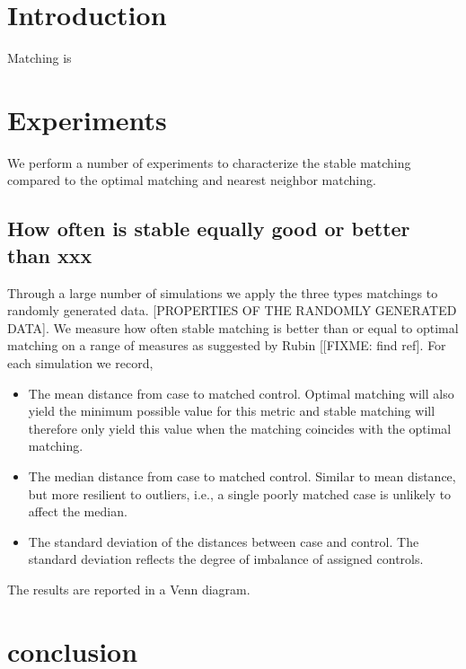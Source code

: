 \documentclass{article}
\begin{document}
\section{Introduction}

Matching is 

\section{Experiments}

We perform a number of experiments to characterize the stable matching compared to the optimal matching and nearest neighbor matching.

\subsection{How often is stable equally good or better than xxx}

Through a large number of simulations we apply the three types matchings to randomly generated data.
[PROPERTIES OF THE RANDOMLY GENERATED DATA].
We measure how often stable matching is better than or equal to optimal matching on a range
of measures as suggested by Rubin [[FIXME: find ref].
For each simulation we record, 

\begin{itemize}
  \item The mean distance from case to matched control. Optimal matching will also yield the minimum possible value for this metric and stable matching will therefore only yield this value when the matching coincides with the optimal matching. 
  \item The median distance from case to matched control. Similar to mean distance, but more resilient to outliers, i.e., a single poorly matched case is unlikely to affect the median.
  \item The standard deviation of the distances between case and control. The standard deviation reflects the degree of imbalance of assigned controls.
\end{itemize}

The results are reported in a Venn diagram. 

\section{conclusion}
\end{document}
